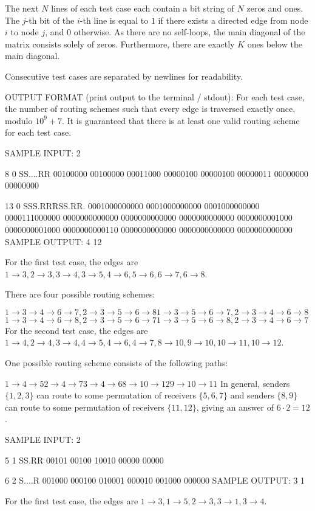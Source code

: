 \documentclass[12pt]{article}
\begin{document}
The next $N$ lines of each test case each contain a bit string of $N$ zeros and
ones. The $j$-th bit of the $i$-th line is equal to $1$ if there exists a
directed edge from node $i$  to node $j$, and $0$ otherwise. As there are no
self-loops, the main diagonal of the matrix consists solely of zeros.
Furthermore, there are exactly $K$ ones below the main diagonal. 

Consecutive test cases are separated by newlines for readability.

OUTPUT FORMAT (print output to the terminal / stdout):
For each test case, the number of routing schemes such that every edge is
traversed exactly once, modulo $10^9+7$. It is guaranteed that there is at least
one valid routing scheme for each test case.

SAMPLE INPUT:
2

8 0
SS....RR
00100000
00100000
00011000
00000100
00000100
00000011
00000000
00000000

13 0
SSS.RRRSS.RR.
0001000000000
0001000000000
0001000000000
0000111000000
0000000000000
0000000000000
0000000000000
0000000001000
0000000001000
0000000000110
0000000000000
0000000000000
0000000000000
SAMPLE OUTPUT: 
4
12

For the first test case, the edges are
$1\to 3, 2\to 3, 3\to 4, 3\to 5, 4\to 6, 5\to 6, 6\to 7, 6\to 8$.

There are four possible routing schemes:

$1\to 3\to 4\to 6\to 7, 2\to 3\to 5\to 6\to 8$$1\to 3\to 5\to 6\to 7, 2\to 3\to 4\to 6\to 8$$1\to 3\to 4\to 6\to 8, 2\to 3\to 5\to 6\to 7$$1\to 3\to 5\to 6\to 8, 2\to 3\to 4\to 6\to 7$
For the second test case, the edges are
$1\to 4, 2\to 4, 3\to 4, 4\to 5,4\to 6,4\to 7, 8\to 10, 9\to 10, 10\to 11, 10\to 12$.

One possible routing scheme consists of the following paths:

$1\to 4\to 5$$2\to 4\to 7$$3\to 4\to 6$$8\to 10\to 12$$9\to 10\to 11$
In general, senders $\{1,2,3\}$ can route to some permutation of receivers
$\{5,6,7\}$ and senders $\{8,9\}$ can route to some permutation of receivers
$\{11,12\}$, giving an answer of $6\cdot 2=12$.

SAMPLE INPUT:
2

5 1
SS.RR
00101
00100
10010
00000
00000

6 2
S....R
001000
000100
010001
000010
001000
000000
SAMPLE OUTPUT: 
3
1

For the first test case, the edges are $1\to 3, 1\to 5, 2\to 3, 3\to 1, 3\to 4$.
\end{document}
